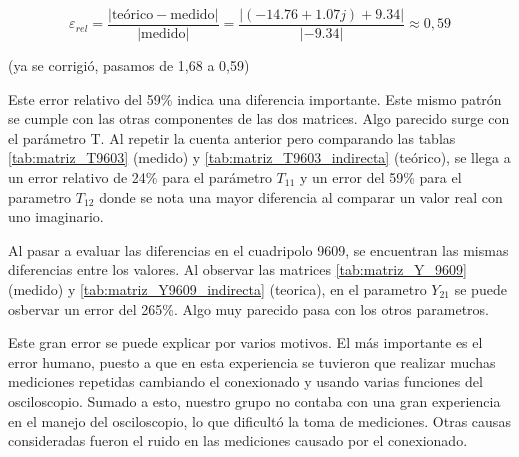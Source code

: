 







\[
\varepsilon_{rel} = \frac{|\text{teórico} - \text{medido}|}{|\text{medido}|} = \frac{|(-14.76 + 1.07j) + 9.34|}{|-9.34|} \approx 0,59
\] 

 (ya se corrigió, pasamos de 1,68 a 0,59)



Este error relativo del 59\% indica una diferencia importante. Este mismo patrón se cumple con las otras componentes de las dos matrices. Algo parecido surge con el parámetro T. Al repetir la cuenta anterior pero comparando las tablas \ref{tab:matriz_T9603} (medido) y \ref{tab:matriz_T9603_indirecta} (teórico), se llega a un error relativo de 24\% para el parámetro $T_{11}$ y un error del 59\% para el parametro $T_{12}$ donde se nota una mayor diferencia al comparar un valor real con uno imaginario. \par

Al pasar a evaluar las diferencias en el cuadripolo 9609, se encuentran las mismas diferencias entre los valores. Al observar las matrices \ref{tab:matriz_Y_9609} (medido) y \ref{tab:matriz_Y9609_indirecta} (teorica), en el parametro $Y_{21}$ se puede osbervar un error del 265\%. Algo muy parecido pasa con los otros parametros.

Este gran error se puede explicar por varios motivos. El más importante es el error humano, puesto a que en esta experiencia se tuvieron que realizar muchas mediciones repetidas cambiando el conexionado y usando varias funciones del osciloscopio. Sumado a esto, nuestro grupo no contaba con una gran experiencia en el manejo del osciloscopio, lo que dificultó la toma de mediciones. Otras causas consideradas fueron el ruido en las mediciones causado por el conexionado.


